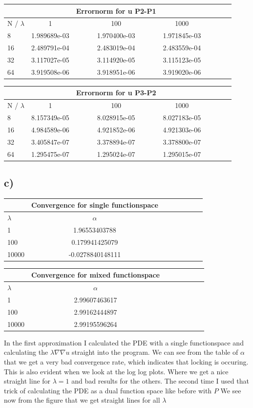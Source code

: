 \documentclass[a4paper,norsk]{article}
\begin{document}
\begin{tabular}{l*{6}{c}r}
 & & Errornorm for u  P2-P1 &  \\
\hline
N / $\lambda$      &1 & 100 & 1000  \\
\hline
8   & 1.989689e-03 & 1.970400e-03 & 1.971845e-03 \\
16 & 2.489791e-04 & 2.483019e-04 & 2.483559e-04 \\
32 & 3.117027e-05 & 3.114920e-05 & 3.115123e-05 \\
64 & 3.919508e-06 & 3.918951e-06 & 3.919020e-06 \\
\end{tabular}




\begin{tabular}{l*{6}{c}r}
 & & Errornorm for u  P3-P2 &  \\
\hline
N / $\lambda$      &1 & 100 & 1000  \\
\hline
8   &   8.157349e-05 & 8.028915e-05 & 8.027183e-05 \\
16 &  4.984589e-06 & 4.921852e-06 & 4.921303e-06 \\
32 &   3.405847e-07 & 3.378894e-07 & 3.378800e-07 \\
64 &  1.295475e-07 & 1.295024e-07 &1.295015e-07 \\
\end{tabular}

\subsection*{c)}
\begin{tabular}{l*{6}{c}r}
& Convergence for single functionspace \\
\hline
$\lambda$  & $\alpha    $   \\
\hline
1 & 1.96553403788 \\
100 & 0.179941425079 \\
10000 & -0.0278840148111 \\
\end{tabular}

\begin{tabular}{l*{6}{c}r}
& Convergence for mixed functionspace \\
\hline
$\lambda$  & $\alpha    $   \\
\hline
1 & 2.99607463617 \\
100 & 2.99162444897 \\
10000 & 2.99195596264 \\
\end{tabular}
\newline
In the first approximation I calculated the PDE with a single functionspace and calculating the $\lambda \nabla \nabla u$ straight into the program. We can see from the table of $\alpha $ that we get a very bad convergence rate, which indicates that locking is occuring. This is also evident when we look at the log log plots. Where we get a nice straight line for $\lambda = 1$ and bad results for the others.
The second time I used that trick of calculating the PDE as a dual function space like before with $P$
We see now from the figure that we get straight lines for all $\lambda$
\end{document}
